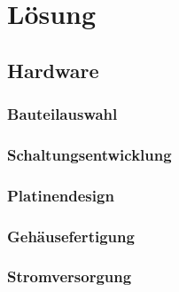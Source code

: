 \chapter{Lösung}

\section{Hardware}

\subsection{Bauteilauswahl}

\subsection{Schaltungsentwicklung}

\subsection{Platinendesign}

\subsection{Gehäusefertigung}

\subsection{Stromversorgung}

